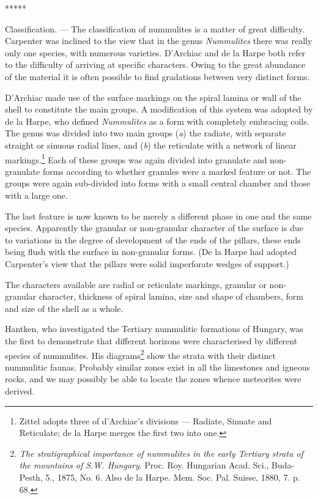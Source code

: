 \documentclass[a4paper, 12pt, oneside]{article}
\begin{document}
\centerline{*\hspace{15mm}*\hspace{15mm}*\hspace{15mm}*\hspace{15mm}*}
\bigskip

Classification. --- The classification of nummulites is a matter of great difficulty. Carpenter was inclined to the view that in the genus \emph{Nummulites} there was really only one species, with numerous varieties. D'Archiac and de la Harpe both refer to the difficulty of arriving at specific characters. Owing to the great abundance of the material it is often possible to find gradations between very distinct forms.

D'Archiac made use of the surface markings on the spiral lamina or wall of the shell to constitute the main groups. A modification of this system was adopted by de la Harpe, who defined \emph{Nummulites} as a form with completely embracing coils. The genus was divided into two main groups (\emph{a}) the radiate, with separate straight or sinuous radial lines, and (\emph{b}) the reticulate with a network of linear markings.\footnote{Zittel adopts three of d'Archiac's divisions --- Radiate, Sinuate and Reticulate; de la Harpe merges the first two into one.} Each of these groups was again divided into granulate and non-granulate forms according to whether granules were a marked feature or not. The groups were again sub-divided into forms with a small central chamber and those with a large one.

The last feature is now known to be merely a different phase in one and the same species. Apparently the granular or non-granular character of the surface is due to variations in the degree of development of the ends of the pillars, these ends being flush with the surface in non-granular forms. (De la Harpe had adopted Carpenter's view that the pillars were solid imperforate wedges of support.)

The characters available are radial or reticulate markings, granular or non-granular character, thickness of spiral lamina, size and shape of chambers, form and size of the shell as a whole.

Hantken, who investigated the Tertiary nummulitic formations of Hungary, was the first to demonstrate that different horizons were characterised by different species of nummulites. His diagrams\footnote{\emph{The stratigraphical importance of nummulites in the early Tertiary strata of the mountains of S.W. Hungary}. Proc. Roy. Hungarian Acad. Sci., Buda-Pesth, 5., 1875, No. 6. Also de la Harpe. Mem. Soc. Pal. Suisse, 1880, 7. p. 68.} show the strata with their distinct nummulitic faunas. Probably similar zones exist in all the limestones and igneous rocks, and we may possibly be able to locate the zones whence meteorites were derived.
\end{document}
